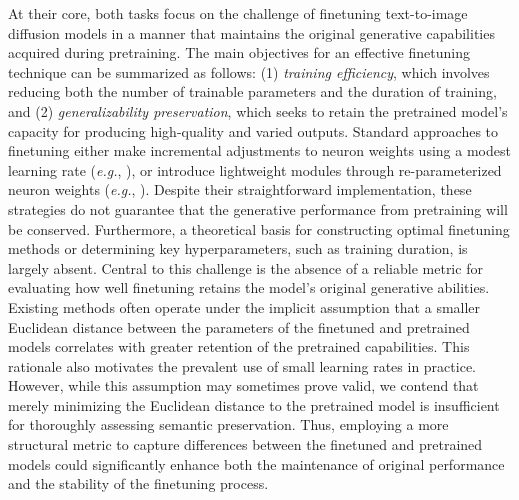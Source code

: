 At their core, both tasks focus on the challenge of finetuning text-to-image diffusion models in a manner that maintains the original generative capabilities acquired during pretraining. The main objectives for an effective finetuning technique can be summarized as follows: (1) \emph{training efficiency}, which involves reducing both the number of trainable parameters and the duration of training, and (2) \emph{generalizability preservation}, which seeks to retain the pretrained model’s capacity for producing high-quality and varied outputs. Standard approaches to finetuning either make incremental adjustments to neuron weights using a modest learning rate (\emph{e.g.}, \cite{ruiz2023dreambooth}), or introduce lightweight modules through re-parameterized neuron weights (\emph{e.g.}, \cite{hulora2022,zhang2023adding}). Despite their straightforward implementation, these strategies do not guarantee that the generative performance from pretraining will be conserved. Furthermore, a theoretical basis for constructing optimal finetuning methods or determining key hyperparameters, such as training duration, is largely absent. Central to this challenge is the absence of a reliable metric for evaluating how well finetuning retains the model's original generative abilities. Existing methods often operate under the implicit assumption that a smaller Euclidean distance between the parameters of the finetuned and pretrained models correlates with greater retention of the pretrained capabilities. This rationale also motivates the prevalent use of small learning rates in practice. However, while this assumption may sometimes prove valid, we contend that merely minimizing the Euclidean distance to the pretrained model is insufficient for thoroughly assessing semantic preservation. Thus, employing a more structural metric to capture differences between the finetuned and pretrained models could significantly enhance both the maintenance of original performance and the stability of the finetuning process.

